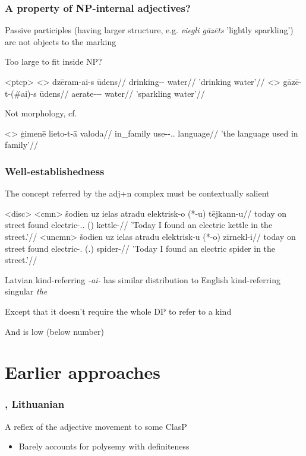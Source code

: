 \documentclass[9pt, t]{beamer}
\begin{document}
\begin{frame}
    \frametitle{A property of NP-internal adjectives?}

    Passive participles (having larger structure, e.g. \textit{viegli gāzēts} 'lightly sparkling') are not objects to the marking

    Too large to fit inside NP?

    \pex<ptcp>
        \a<> \begingl
            \gla dzēram-ai-s ūdens//
            \glb drinking-\Def-\Nom{} water//
            \glft 'drinking water'//
        \endgl
        \a<> \begingl
            \gla gāzē-t-(\#ai)-s ūdens//
            \glb aerate-\Ptcp-\Def-\Nom{} water//
            \glft 'sparkling water'//
        \endgl
    \xe

    Not morphology, cf.

    \ex<>
        \begingl
            \gla ģimenē lieto-t-ā valoda//
            \glb in\_family use-\Ptcp-\Def.\F.\Nom{} language//
            \glft 'the language used in family'//
        \endgl
    \xe

\end{frame}

\begin{frame}
    \frametitle{Well-establishedness}

    The concept referred by the adj+n complex must be contextually salient

    \pex<disc>
        \a<cmn> \begingl
            \gla šodien uz ielas atradu elektrisk-o (*-u) tējkann-u//
            \glb today on street found electric-\M.\Def.\Acc{} (\Acc{}) kettle-\Acc{}//
            \glft 'Today I found an electric kettle in the street.'//
        \endgl
        \a<uncmn> \begingl
            \gla šodien uz ielas atradu elektrisk-u (*-o) zirnekl-i//
            \glb today on street found electric-\M.\Acc{} (\Def.\Acc) spider-\Acc{}//
            \glft 'Today I found an electric spider in the street.'//
        \endgl
    \xe

    \pause

    Latvian kind-referring \textit{-ai-} has similar distribution to English kind-referring singular \textit{the}

    Except that it doesn't require the whole DP to refer to a kind

    And is low (below number)

\end{frame}

\section{Earlier approaches}
\begin{frame}
    \frametitle{\citep{rutpro2006}, Lithuanian}

    A reflex of the adjective movement to some ClasP

    \begin{itemize}
        \item Barely accounts for polysemy with definiteness
    \end{itemize}

\end{frame}
\end{document}
